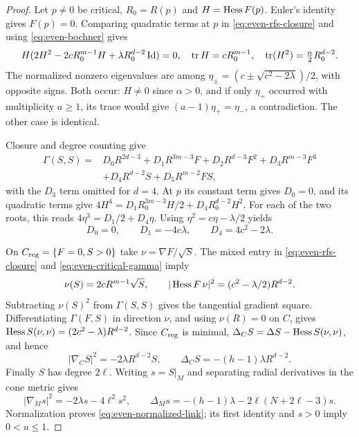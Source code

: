 \begin{proof}
Let $p\ne0$ be critical, $R_0=R(p)$ and $H=\operatorname{Hess} F(p)$.
Euler's identity gives $F(p)=0$. Comparing quadratic terms at $p$
in \eqref{eq:even-rfs-closure} and using \eqref{eq:even-bochner} gives
\begin{equation}\label{eq:even-critical-hessian}
 H(2H^2-2cR_0^{m-1}H+\lambda R_0^{d-2}\operatorname{Id})=0,
 \quad \operatorname{tr} H=cR_0^{m-1},\quad
 \operatorname{tr}(H^2)=\tfrac\alpha2R_0^{d-2}.
\end{equation}
The normalized nonzero eigenvalues are among
$\eta_\pm=(c\pm\sqrt{c^2-2\lambda})/2$, with opposite signs.
Both occur: $H\ne0$ since $\alpha>0$, and if only $\eta_+$
occurred with multiplicity $a\ge1$, its trace would give
$(a-1)\eta_+=\eta_-$, a contradiction. The other case is identical.

Closure and degree counting give
\begin{align*}
 \Gamma(S,S)={}&D_0R^{2d-3}+D_1R^{3m-3}F
 +D_2R^{d-3}F^2+D_3R^{m-3}F^3\\
 &+D_4R^{d-2}S+D_5R^{m-2}FS,
\end{align*}
with the $D_3$ term omitted for $d=4$.
At $p$ its constant term gives $D_0=0$, and its quadratic terms give
$4H^4=D_1R_0^{3m-3}H/2+D_4R_0^{d-2}H^2$.
For each of the two roots, this reads $4\eta^3=D_1/2+D_4\eta$.
Using $\eta^2=c\eta-\lambda/2$ yields
\begin{equation}\label{eq:even-critical-gamma}
 D_0=0,\qquad D_1=-4c\lambda,\qquad D_4=4c^2-2\lambda.
\end{equation}

On $C_{\mathrm{reg}}=\{F=0,S>0\}$ take $\nu=\nabla F/\sqrt S$.
The mixed entry in \eqref{eq:even-rfs-closure} and
\eqref{eq:even-critical-gamma} imply
\[
 \nu(S)=2cR^{m-1}\sqrt S,\qquad
 |\operatorname{Hess} F\,\nu|^2=(c^2-\lambda/2)R^{d-2}.
\]
Subtracting $\nu(S)^2$ from $\Gamma(S,S)$ gives the tangential
gradient square. Differentiating $\Gamma(F,S)$ in direction $\nu$,
and using $\nu(R)=0$ on $C$, gives
$\operatorname{Hess} S(\nu,\nu)=(2c^2-\lambda)R^{d-2}$.
Since $C_{\mathrm{reg}}$ is minimal,
$\Delta_CS=\Delta S-\operatorname{Hess} S(\nu,\nu)$, and hence
\begin{equation}\label{eq:even-cone-structure}
 |\nabla_CS|^2=-2\lambda R^{d-2}S,\qquad
 \Delta_CS=-(h-1)\lambda R^{d-2}.
\end{equation}
Finally $S$ has degree $2\ell$. Writing $s=S|_M$ and separating
radial derivatives in the cone metric gives
\[
 |\nabla_Ms|^2=-2\lambda s-4\ell^2s^2,\qquad
 \Delta_Ms=-(h-1)\lambda-2\ell(N+2\ell-3)s.
\]
Normalization proves \eqref{eq:even-normalized-link}; its first
identity and $s>0$ imply $0<u\le1$.
\end{proof}
